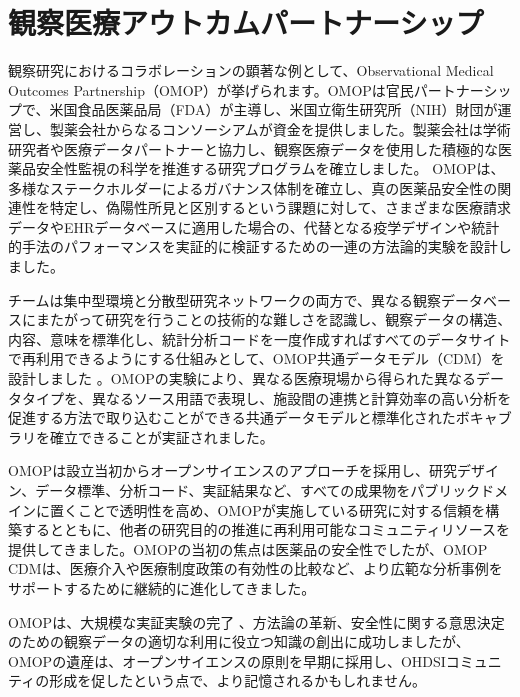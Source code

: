\documentclass[
  11pt]{book}
\theoremstyle{definition}
\theoremstyle{definition}
\theoremstyle{definition}
\theoremstyle{definition}
\theoremstyle{remark}
\begin{document}
\section{観察医療アウトカムパートナーシップ}\label{ux89b3ux5bdfux533bux7642ux30a2ux30a6ux30c8ux30abux30e0ux30d1ux30fcux30c8ux30caux30fcux30b7ux30c3ux30d7}

観察研究におけるコラボレーションの顕著な例として、Observational Medical Outcomes Partnership（OMOP）が挙げられます。OMOPは官民パートナーシップで、米国食品医薬品局（FDA）が主導し、米国立衛生研究所（NIH）財団が運営し、製薬会社からなるコンソーシアムが資金を提供しました。製薬会社は学術研究者や医療データパートナーと協力し、観察医療データを使用した積極的な医薬品安全性監視の科学を推進する研究プログラムを確立しました。 \citep{stang2010omop} OMOPは、多様なステークホルダーによるガバナンス体制を確立し、真の医薬品安全性の関連性を特定し、偽陽性所見と区別するという課題に対して、さまざまな医療請求データやEHRデータベースに適用した場合の、代替となる疫学デザインや統計的手法のパフォーマンスを実証的に検証するための一連の方法論的実験を設計しました。

チームは集中型環境と分散型研究ネットワークの両方で、異なる観察データベースにまたがって研究を行うことの技術的な難しさを認識し、観察データの構造、内容、意味を標準化し、統計分析コードを一度作成すればすべてのデータサイトで再利用できるようにする仕組みとして、OMOP共通データモデル（CDM）を設計しました \citep{overhage2012cdm} 。OMOPの実験により、異なる医療現場から得られた異なるデータタイプを、異なるソース用語で表現し、施設間の連携と計算効率の高い分析を促進する方法で取り込むことができる共通データモデルと標準化されたボキャブラリを確立できることが実証されました。

OMOPは設立当初からオープンサイエンスのアプローチを採用し、研究デザイン、データ標準、分析コード、実証結果など、すべての成果物をパブリックドメインに置くことで透明性を高め、OMOPが実施している研究に対する信頼を構築するとともに、他者の研究目的の推進に再利用可能なコミュニティリソースを提供してきました。OMOPの当初の焦点は医薬品の安全性でしたが、OMOP CDMは、医療介入や医療制度政策の有効性の比較など、より広範な分析事例をサポートするために継続的に進化してきました。

OMOPは、大規模な実証実験の完了\citep{ryan2012omop, ryan2013omop} 、方法論の革新\citep{schuemie_2014}、安全性に関する意思決定のための観察データの適切な利用に役立つ知識の創出\citep{madigan_2013, madigan2013design}に成功しましたが、OMOPの遺産は、オープンサイエンスの原則を早期に採用し、OHDSIコミュニティの形成を促したという点で、より記憶されるかもしれません。
\end{document}
